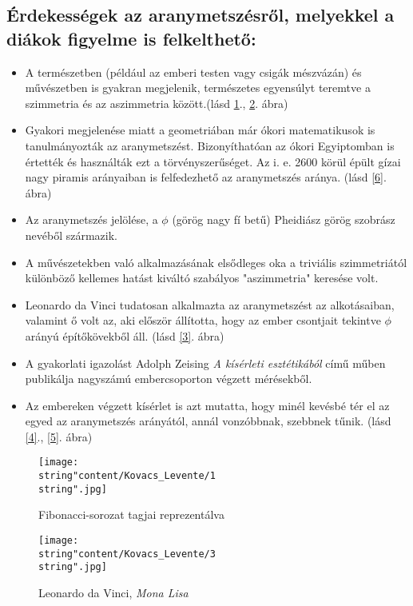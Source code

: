 \subsection*{Érdekességek az aranymetszésről, melyekkel a diákok figyelme
is felkelthető:} 
\begin{itemize}
\item A természetben (például az emberi testen vagy csigák mészvázán) és
művészetben is gyakran megjelenik, természetes egyensúlyt teremtve
a szimmetria és az aszimmetria között.(lásd \ref{1}., \ref{2}. ábra) 
\item Gyakori megjelenése miatt a geometriában már ókori matematikusok is
tanulmányozták az aranymetszést. Bizonyíthatóan az ókori Egyiptomban
is értették és használták ezt a törvényszerűséget. Az i. e. 2600 körül
épült gízai nagy piramis arányaiban is felfedezhető az aranymetszés
aránya. (lásd \ref{6}. ábra) 
\item Az aranymetszés jelölése, a $\phi$ (görög nagy fí betű) Pheidiász
görög szobrász nevéből származik. 
\item A művészetekben való alkalmazásának elsődleges oka a triviális szimmetriától
különböző kellemes hatást kiváltó szabályos "aszimmetria" keresése
volt. 
\item Leonardo da Vinci tudatosan alkalmazta az aranymetszést az alkotásaiban,
valamint ő volt az, aki először állította, hogy az ember csontjait
tekintve $\phi$ arányú építőkövekből áll. (lásd \ref{3}. ábra) 
\item A gyakorlati igazolást Adolph Zeising \textit{A kísérleti esztétikából}
című műben publikálja nagyszámú embercsoporton végzett mérésekből. 
\item Az embereken végzett kísérlet is azt mutatta, hogy minél kevésbé tér
el az egyed az aranymetszés arányától, annál vonzóbbnak, szebbnek
tűnik. (lásd \ref{4}., \ref{5}. ábra) 
\end{itemize}
\begin{figure}[h!]
\centering \texttt{[image: \\string"content/Kovacs\_Levente/1\\string".jpg]}
\vspace{2mm}
 \caption{Fibonacci-sorozat tagjai reprezentálva}
\label{1}
\end{figure}

\begin{figure}[h!]
\centering \texttt{[image: \\string"content/Kovacs\_Levente/3\\string".jpg]}
\vspace{2mm}
 \caption{Leonardo da Vinci, \textit{Mona Lisa}}
\label{2}
\end{figure}

